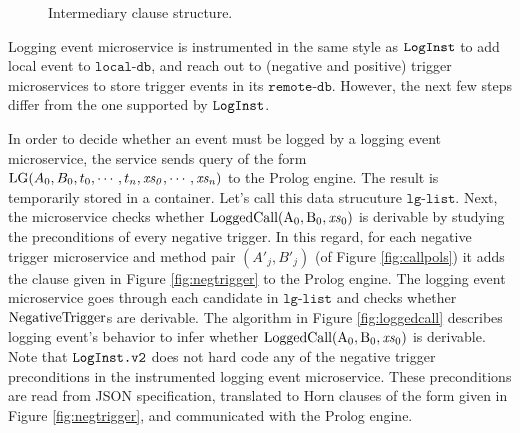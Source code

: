 \begin{figure}
\setlength{\fboxsep}{0pt}%
\caption{Intermediary clause structure.} 
\label{fig:intermediary}
\end{figure}

Logging event microservice is instrumented in the same style as $\texttt{LogInst}$ to add local event to $\texttt{local-db}$, and reach out to (negative and positive) trigger microservices to store trigger events in its $\texttt{remote-db}$. However, the next few steps differ from the one supported by $\texttt{LogInst}$.

In order to decide whether an event must be logged by a logging event microservice, the service sends query of the form $\mathrm{LG}(A_0, B_0, t_0, \cdots, t_n,\mathit{xs_0}, \cdots, \mathit{xs_n})$ to the Prolog engine. The result is temporarily stored in a container. Let's call this data strucuture $\texttt{lg-list}$. %
Next, the microservice checks whether $\mathrm{LoggedCall(A_0, B_0, \mathit{xs}_0)}$ is derivable by studying the preconditions of every negative trigger. In this regard, for each negative trigger microservice and method pair $(A'_j, B'_j)$ (of Figure \ref{fig:callpols}) it adds the clause given in Figure \ref{fig:negtrigger} to the Prolog engine. The logging event microservice goes through each candidate in $\texttt{lg-list}$ and checks whether $\mathrm{NegativeTrigger}$s are derivable. The algorithm in Figure \ref{fig:loggedcall} describes logging event's behavior to infer whether $\mathrm{LoggedCall(A_0, B_0, \mathit{xs}_0)}$ is derivable. Note that $\texttt{LogInst.v2}$ does not hard code any of the negative trigger preconditions in the instrumented logging event microservice. These preconditions are read  from JSON specification, translated to Horn clauses of the form given in Figure \ref{fig:negtrigger}, and communicated with the Prolog engine.

